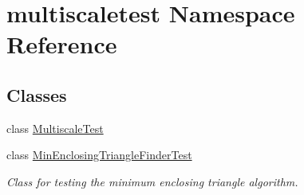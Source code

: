 \hypertarget{namespacemultiscaletest}{\section{multiscaletest Namespace Reference}
\label{namespacemultiscaletest}
}
\subsection*{Classes}
\begin{DoxyCompactItemize}
\item 
class \hyperlink{classmultiscaletest_1_1MultiscaleTest}{Multiscale\-Test}
\item 
class \hyperlink{classmultiscaletest_1_1MinEnclosingTriangleFinderTest}{Min\-Enclosing\-Triangle\-Finder\-Test}
\begin{DoxyCompactList}\small\item\em Class for testing the minimum enclosing triangle algorithm. \end{DoxyCompactList}\end{DoxyCompactItemize}
